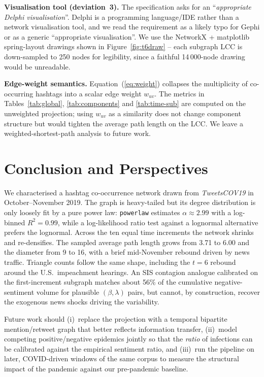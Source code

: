 \documentclass[conference]{IEEEtran}
\begin{document}
\textbf{Visualisation tool (deviation~3).}  The specification
asks for an ``\textit{appropriate Delphi visualisation}''.
Delphi is a programming language/IDE rather than a network
visualisation tool, and we read the requirement as a likely
typo for Gephi or as a generic ``appropriate visualisation''.
We use the NetworkX + matplotlib spring-layout drawings
shown in Figure~\ref{fig:t6draw} -- each subgraph LCC is
down-sampled to 250 nodes for legibility, since a faithful
14\,000-node drawing would be unreadable.

\textbf{Edge-weight semantics.}  Equation~(\ref{eq:weight})
collapses the multiplicity of co-occurring hashtags into a
scalar edge weight $w_{uv}$.  The metrics in
Tables~\ref{tab:global}, \ref{tab:components} and
\ref{tab:time-sub} are computed on the unweighted
projection; using $w_{uv}$ as a similarity does not change
component structure but would tighten the average path
length on the LCC.  We leave a weighted-shortest-path
analysis to future work.

\section{Conclusion and Perspectives}
\label{sec:concl}
We characterised a hashtag co-occurrence network drawn from
\textit{TweetsCOV19} in October--November 2019.  The graph is
heavy-tailed but its degree distribution is only loosely fit by
a pure power law: \texttt{powerlaw} estimates $\alpha \approx
2.99$ with a log-binned $R^{2}=0.99$, while a log-likelihood
ratio test against a lognormal alternative prefers the
lognormal.  Across the ten equal time increments the network
shrinks and re-densifies.  The sampled average path length
grows from 3.71 to 6.00 and the diameter from 9 to 16, with a
brief mid-November rebound driven by news traffic.  Triangle
counts follow the same shape, including the $t\!=\!6$ rebound
around the U.S.\ impeachment hearings.  An SIS contagion
analogue calibrated on the first-increment subgraph matches
about 56\% of the cumulative negative-sentiment volume for
plausible $(\beta, \lambda)$ pairs, but cannot, by
construction, recover the exogenous news shocks driving the
variability.

Future work should (i)~replace the projection with a temporal
bipartite mention/retweet graph that better reflects
information transfer, (ii)~model competing positive/negative
epidemics jointly so that the \emph{ratio} of infections can be
calibrated against the empirical sentiment ratio, and (iii)~run
the pipeline on later, COVID-driven windows of the same corpus
to measure the structural impact of the pandemic against our
pre-pandemic baseline.
\end{document}
